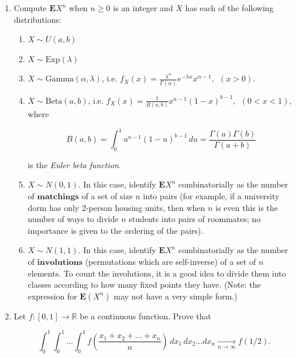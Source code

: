 \documentclass[11pt]{report}
\newcommand{\R}{\mathbb{R}}
\theoremstyle{plain}
\theoremstyle{definition}
\begin{document}
\begin{enumerate}[label=\arabic*.]
(b) Prove that the Euler gamma function satisfies for all $t>0$ the identity

\[
\Gamma(t+1)=t\,\Gamma(t).
\]

(This identity immediately implies the fact that $\Gamma(n+1)=n!$ for integer $n\ge 0$.)

(c) Find a formula for the values of $\Gamma(\cdot)$ at half-integers, that is,

\[
\Gamma\left(n+\tfrac12\right) =\ ?, \qquad (n\ge 0).
\]
\item Compute $\mathbf{E} X^n$ when $n\ge 0$ is an integer and $X$ has each of the following distributions:

\begin{enumerate}[label=(\alph*)]
\item $X\sim U(a,b)$
\item $X\sim \textrm{Exp}(\lambda)$
\item $X\sim \textrm{Gamma}(\alpha, \lambda)$,
i.e. $f_{X}(x) = \frac{\lambda^\alpha}{\Gamma(\alpha)}e^{-\lambda x} x^{\alpha-1}, \ \  (x>0)$.
\item $X\sim \textrm{Beta}(a, b)$,
i.e. $f_X(x) = \frac{1}{B(a,b)} x^{a-1} (1-x)^{b-1}, \ \  (0<x<1)$,
where

\[
B(a,b)=\int_0^1 u^{a-1}(1-u)^{b-1}\,du = \frac{\Gamma(a)\Gamma(b)}{\Gamma(a+b)}
\]

is the \emph{Euler beta function}.
\item $X\sim N(0,1)$. In this case, identify $\mathbf{E} X^n$ combinatorially as the number of $\textbf{matchings}$ of a set of size $n$ into pairs (for example, if a university dorm has only 2-person housing units, then when $n$ is even this is the number of ways to divide $n$ students into pairs of roommates; no importance is given to the ordering of the pairs).
\item $X\sim N(1,1)$. In this case, identify $\mathbf{E} X^n$ combinatorially as the number of $\textbf{involutions}$ (permutations which are self-inverse) of a set of $n$ elements. To count the involutions, it is a good idea to divide them into classes according to how many fixed points they have. (Note: the expression for $\mathbf{E}(X^n)$ may not have a very simple form.)
\end{enumerate}
\item Let $f:[0,1]\to\R$ be a continuous function. Prove that

\[
\int_0^1 \int_0^1 \ldots \int_0^1 f\left(\frac{x_1+x_2+\ldots+x_n}{n}\right)\,dx_1\,dx_2\ldots dx_n \xrightarrow[n\to\infty]{} f(1/2).
\]


\end{enumerate}
\end{document}
